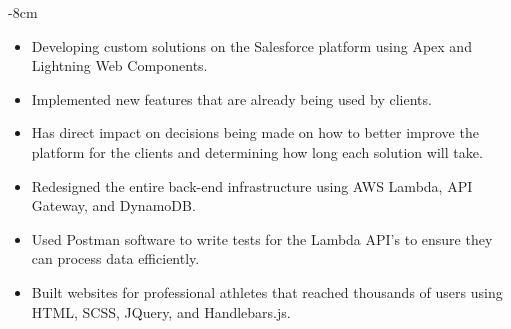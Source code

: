 \documentclass[10pt,a4paper,ragged2e]{altacv}
\begin{document}



\begin{adjustwidth}{}{-8cm}
\makecvheader
\end{adjustwidth}




\begin{itemize}
\item  Developing custom solutions on the Salesforce platform using Apex and Lightning Web Components.
\item Implemented new features that are already being used by clients.
\item Has direct impact on decisions being made on how to better improve the platform for the clients and determining how long each solution will take.

\end{itemize}

\begin{itemize}
    \item Redesigned the entire back-end infrastructure using AWS Lambda, API Gateway, and DynamoDB.
    \item Used Postman software to write tests for the Lambda API's to ensure they can process data efficiently.
    \item Built websites for professional athletes that reached thousands of users using HTML, SCSS, JQuery, and Handlebars.js.
\end{itemize}
\end{document}
